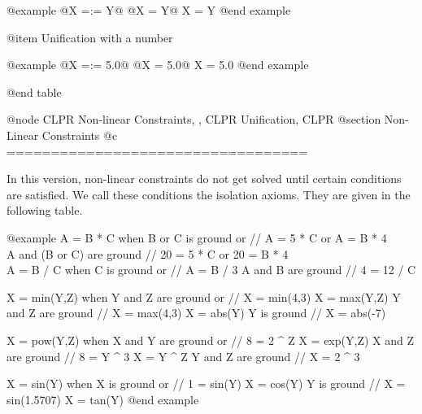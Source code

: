 @example
@{X =:= Y@}
@{X = Y@}
X = Y
@end example

@item Unification with a number

@example
@{X =:= 5.0@}
@{X = 5.0@}
X = 5.0
@end example
	
@end table

@node CLPR Non-linear Constraints, , CLPR Unification, CLPR
@section Non-Linear Constraints
@c ==================================

In this version, non-linear constraints do not get solved until certain
conditions are satisfied. We call these conditions the isolation axioms.
They are given in the following table.

@example
A = B * C         when B or C is ground	or		 // A = 5 * C or A = B * 4 \\
	                      A and (B or C) are ground	 // 20 = 5 * C or 20 = B * 4 \\

A = B / C      when C is ground or			// A = B / 3 
	                      A and B are ground		// 4 = 12 / C 

X = min(Y,Z)     when Y and Z are ground or	// X = min(4,3) 
X = max(Y,Z)         Y and Z are ground		// X = max(4,3) 
X = abs(Y)                Y is ground			// X = abs(-7) 

X = pow(Y,Z)   when X and Y are ground or		// 8 = 2 ^ Z 
X = exp(Y,Z)           X and Z are ground		// 8 = Y ^ 3 
X = Y ^ Z            Y and Z are ground		// X = 2 ^ 3 

X = sin(Y)	    when X is ground or			// 1 = sin(Y) 
X = cos(Y)	               Y is ground			// X = sin(1.5707) 
X = tan(Y)
@end example

